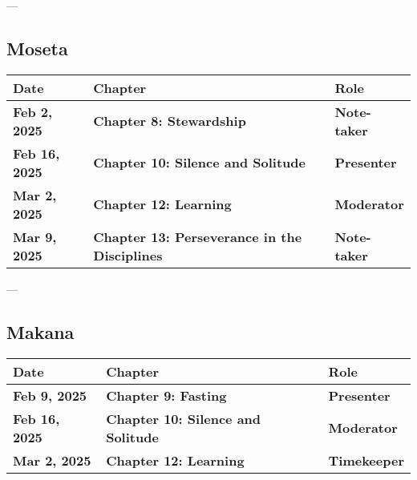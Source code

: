 \documentclass[10pt]{article}
\begin{document}
---

\subsection*{Moseta}
\begin{tcolorbox}[colframe=blue!40, colback=yellow!10, coltitle=black, sharp corners=south, boxrule=0.4mm, width=\textwidth-2mm]
\renewcommand{\arraystretch}{1.5} %
\begin{longtable}{|@{}p{2.5cm}|@{}p{3.5cm}|@{}p{2.5cm}|}
\hline
\textbf{Date} & \textbf{Chapter} & \textbf{Role} \\
\hline
\endhead
\hline
\endlastfoot
\textbf{Feb 2, 2025} & \textbf{Chapter 8: Stewardship} & \textbf{Note-taker} \\
\hline
\textbf{Feb 16, 2025} & \textbf{Chapter 10: Silence and Solitude} & \textbf{Presenter} \\
\hline
\textbf{Mar 2, 2025} & \textbf{Chapter 12: Learning} & \textbf{Moderator} \\
\hline
\textbf{Mar 9, 2025} & \textbf{Chapter 13: Perseverance in the Disciplines} & \textbf{Note-taker} \\
\hline
\end{longtable}
\end{tcolorbox}

---

\subsection*{Makana}
\begin{tcolorbox}[colframe=blue!40, colback=yellow!10, coltitle=black, sharp corners=south, boxrule=0.4mm, width=\textwidth-2mm]
\renewcommand{\arraystretch}{1.5} %
\begin{longtable}{|@{}p{2.5cm}|@{}p{3.5cm}|@{}p{2.5cm}|}
\hline
\textbf{Date} & \textbf{Chapter} & \textbf{Role} \\
\hline
\endhead
\hline
\endlastfoot
\textbf{Feb 9, 2025} & \textbf{Chapter 9: Fasting} & \textbf{Presenter} \\
\hline
\textbf{Feb 16, 2025} & \textbf{Chapter 10: Silence and Solitude} & \textbf{Moderator} \\
\hline
\textbf{Mar 2, 2025} & \textbf{Chapter 12: Learning} & \textbf{Timekeeper} \\
\hline
\end{longtable}
\end{tcolorbox}
\end{document}
